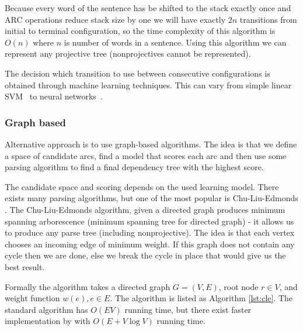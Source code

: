 Because every word of the sentence has be shifted to the stack exactly once
and {\ttfamily ARC} operations reduce stack size by one we will have exactly
$2n$ transitions from initial to terminal configuration, so the time complexity of this
algorithm is $O(n)$ where $n$ is number of words in a sentence.
Using this algorithm we can represent any projective tree 
\cite{nivre_algorithms_2008} (nonprojectives cannot be represented).

The decision which transition to use between consecutive configurations is
obtained through machine learning techniques. This can vary from simple
linear SVM~\cite{nivre_maltparser:_2005} to neural networks~\cite{chen_fast_2014,
andor_globally_2016}.

\subsubsection{Graph based}
Alternative approach is to use graph-based algorithms. The idea is that we define
a space of candidate arcs, find a model that scores each arc and then use some parsing
algorithm to find a final dependency tree with the highest score.

The candidate space and scoring depends on the used learning model.
There exists many parsing algorithms, but one of the most popular is
Chu-Liu-Edmonds \cite{edmonds_optimim_1966}.
The Chu-Liu-Edmonds algorithm, given a directed graph produces minimum spanning
arborescence (minimum spanning tree for directed graph) - it allows us to produce
any parse tree (including nonprojective). The idea is that each vertex chooses 
an incoming edge of minimum weight. If this graph does not contain any cycle then
we are done, else we break the cycle in place that would give us the best result.

Formally the algorithm takes a directed graph $G = (V,E)$, root node $r \in V$,
and weight function $w(e), e \in E$. The algorithm is listed as Algorithm \ref{lst:cle}. 
The standard algorithm has $O(EV)$ running time, but there exist faster implementation
by \cite{gabow_efficient_1986} with $O(E + V\log V)$ running time.

